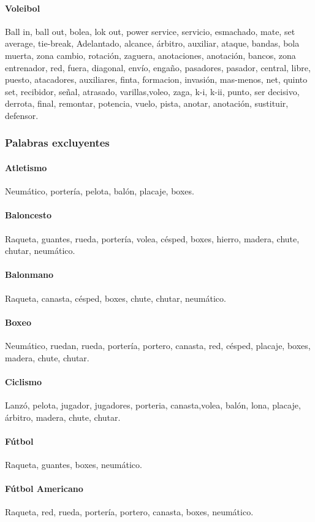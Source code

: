 \documentclass[../all.tex]{subfiles}
\begin{document}
    \paragraph{Voleibol}
    Ball in, ball out, bolea, lok out, power service, servicio, esmachado, mate, set average, tie-break, Adelantado, alcance, árbitro, auxiliar, ataque, bandas, bola muerta, zona cambio, rotación, zaguera, anotaciones, anotación, bancos, zona entrenador, red, fuera, diagonal, envío, engaño, pasadores, pasador, central, libre, puesto, atacadores, auxiliares, finta, formacion, invasión, mas-menos, net, quinto set, recibidor, señal, atrasado, varillas,voleo, zaga, k-i, k-ii, punto, ser decisivo, derrota, final, remontar, potencia, vuelo, pista, anotar, anotación, sustituir, defensor.
\newpage
\subsubsection{Palabras excluyentes}
    \paragraph{Atletismo}
    Neumático, portería, pelota, balón, placaje, boxes.
    \paragraph{Baloncesto}
    Raqueta, guantes, rueda, portería, volea, césped, boxes, hierro, madera, chute, chutar, neumático.
    \paragraph{Balonmano}
    Raqueta, canasta, césped, boxes, chute, chutar, neumático.
    \paragraph{Boxeo}
    Neumático, ruedan, rueda, portería, portero, canasta, red, césped, placaje, boxes, madera, chute, chutar.
    \paragraph{Ciclismo}
    Lanzó, pelota, jugador, jugadores, porteria, canasta,volea, balón, lona, placaje, árbitro, madera, chute, chutar.
    \paragraph{Fútbol}
    Raqueta, guantes, boxes, neumático.
    \paragraph{Fútbol Americano}
    Raqueta, red, rueda, portería, portero, canasta, boxes, neumático.
\end{document}
